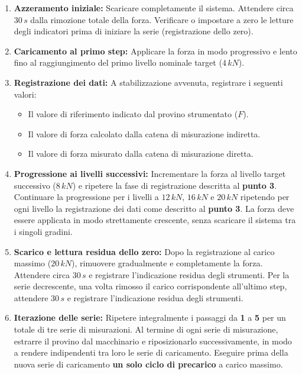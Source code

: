 \documentclass[a4paper, twoside]{article}
\begin{document}
\begin{enumerate}
    
    \item \textbf{Azzeramento iniziale:} Scaricare completamente il sistema. Attendere circa $30\,s$ dalla rimozione totale della forza. Verificare o impostare a zero le letture degli indicatori prima di iniziare la serie (registrazione dello zero).
    
    \item \textbf{Caricamento al primo step:} Applicare la forza in modo progressivo e lento fino al raggiungimento del primo livello nominale target ($4\,kN$).
    
    \item \textbf{Registrazione dei dati:} A stabilizzazione avvenuta, registrare i seguenti valori:
    
    \begin{itemize}
        \item Il valore di riferimento indicato dal provino strumentato ($F$).
        \item Il valore di forza calcolato dalla catena di misurazione indiretta.
        \item Il valore di forza misurato dalla catena di misurazione diretta.
    \end{itemize}

    \item \textbf{Progressione ai livelli successivi:} Incrementare la forza al livello target successivo ($8\,kN$) e ripetere la fase di registrazione descritta al \textbf{punto 3}. Continuare la progressione per i livelli a $12\,kN$, $16\,kN$ e $20\,kN$ ripetendo per ogni livello la registrazione  dei dati come descritto al \textbf{punto 3}. La forza deve essere applicata in modo strettamente crescente, senza scaricare il sistema tra i singoli gradini.
    
    \item \textbf{Scarico e lettura residua dello zero:} Dopo la registrazione al carico massimo ($20\,kN$), rimuovere gradualmente e completamente la forza. Attendere circa $30\,s$ e registrare l'indicazione residua degli strumenti. Per la serie decrescente, una volta rimosso il carico corrispondente all'ultimo step, attendere $30\,s$ e registrare l'indicazione residua degli strumenti.
    
    \item \textbf{Iterazione delle serie:} Ripetere integralmente i passaggi da \textbf{1} a \textbf{5} per un totale di tre serie di misurazioni. Al termine di ogni serie di misurazione, estrarre il provino dal macchinario e riposizionarlo successivamente, in modo a rendere indipendenti tra loro le serie di caricamento. Eseguire prima della nuova serie di caricamento \textbf{un solo ciclo di precarico} a carico massimo.
    
\end{enumerate}
\end{document}
